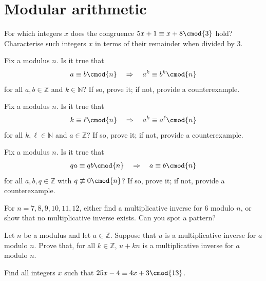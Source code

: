 \section{Modular arithmetic}


\begin{exercise}
For which integers $x$ does the congruence $5x+1 \equiv x+8 \cmod{3}$ hold? Characterise such integers $x$ in terms of their remainder when divided by $3$.
\end{exercise}

\begin{exercise}
Fix a modulus $n$. Is it true that
\[ a \equiv b \cmod{n} \quad \Rightarrow \quad a^k \equiv b^k \cmod{n} \] for all $a,b \in \mathbb{Z}$ and $k \in \mathbb{N}$? If so, prove it; if not, provide a counterexample.
\end{exercise}

\begin{exercise}
Fix a modulus $n$. Is it true that
\[ k \equiv \ell \cmod{n} \quad \Rightarrow \quad a^k \equiv a^{\ell} \cmod{n} \]
for all $k,\ell \in \mathbb{N}$ and $a \in \mathbb{Z}$? If so, prove it; if not, provide a counterexample.
\end{exercise}

\begin{exercise}
Fix a modulus $n$. Is it true that
\[ qa \equiv qb \cmod{n} \quad \Rightarrow \quad a \equiv b \cmod{n} \]
for all $a,b,q \in \mathbb{Z}$ with $q \not \equiv 0 \cmod{n}$? If so, prove it; if not, provide a counterexample.
\end{exercise}

\begin{exercise}
For $n=7,8,9,10,11,12$, either find a multiplicative inverse for $6$ modulo $n$, or show that no multiplicative inverse exists. Can you spot a pattern?
\end{exercise}

\begin{exercise}
Let $n$ be a modulus and let $a \in \mathbb{Z}$. Suppose that $u$ is a multiplicative inverse for $a$ modulo $n$. Prove that, for all $k \in \mathbb{Z}$, $u+kn$ is a multiplicative inverse for $a$ modulo $n$.
\end{exercise}


\begin{exercise}
Find all integers $x$ such that $25x-4 \equiv 4x+3 \cmod{13}$.
\end{exercise}


